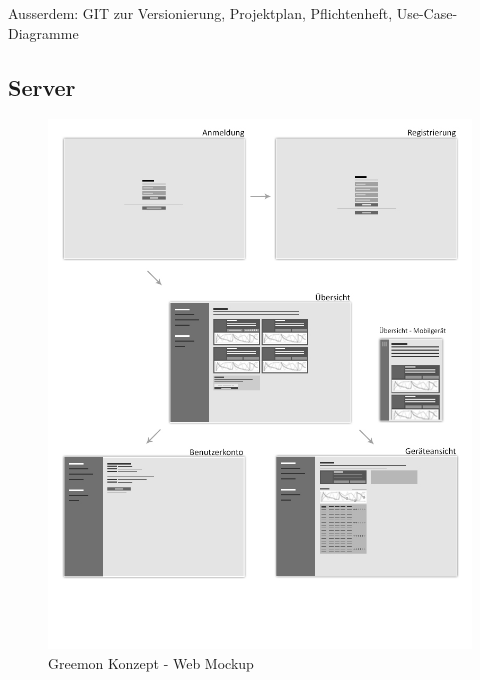 \documentclass[pointlessnumbers]{scrartcl}
\begin{document}
 

Ausserdem: GIT zur Versionierung, Projektplan, Pflichtenheft, Use-Case-Diagramme


\subsection{Server}

\begin{figure}[htbp] 
  \centering
     \includegraphics[width=1\textwidth]{images/wireframe-web.jpg}
  \caption{Greemon Konzept - Web Mockup}
  \label{fig:greemon-web-mockup}
\end{figure}
\end{document}
